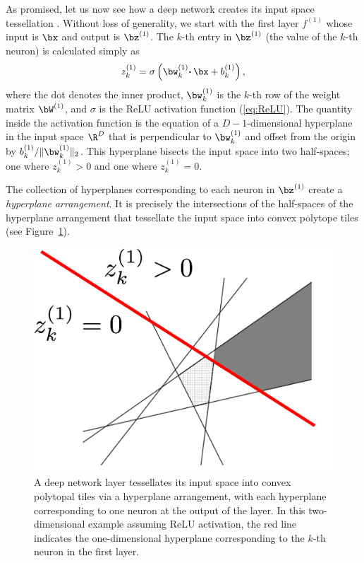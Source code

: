 \documentclass{notices}
\begin{document}
As promised, let us now see how a deep network creates its input space tessellation \cite{balestriero2021madmax}.
Without loss of generality, we start with the first layer $f^{(1)}$ whose input is $\bx$ and output is $\bz^{(1)}$.
The $k$-th entry in $\bz^{(1)}$ (the value of the $k$-th neuron) is calculated simply as 
\begin{equation}
z^{(1)}_k= \sigma \left( 
\bw^{(1)}_k {\boldsymbol{\cdot}}\, \bx + b_k^{(1)} 
  \right),
  \label{eq:neuron}
\end{equation}
where the dot denotes the inner product, $\bw^{(1)}_k$ is the $k$-th row of the weight matrix $\bW^{(1)}$, and $\sigma$ is the ReLU activation function (\ref{eq:ReLU}).
The quantity inside the activation function is the equation of a $D-1$-dimensional hyperplane in the input space $\R^D$ that is perpendicular to $\bw^{(1)}_k$ and offset from the origin by $b_k^{(1)}/\| \bw^{(1)}_k \|_2$.
This hyperplane bisects the input space into two half-spaces; one where $z^{(1)}_k>0$ and one where $z^{(1)}_k=0$.

The collection of hyperplanes corresponding to each neuron in $\bz^{(1)}$ create a {\em hyperplane arrangement}.
It is precisely the intersections of the half-spaces of the hyperplane arrangement that tessellate the input space into convex polytope tiles (see Figure~\ref{fig:ha}).



\begin{figure}[h]
    \centering
\includegraphics[width=0.8\linewidth]{Figs/ha1.png}
    \caption{\small
    A deep network layer tessellates its input space into convex polytopal tiles via a hyperplane arrangement, with each hyperplane corresponding to one neuron at the output of the layer.
    In this two-dimensional example assuming ReLU activation, the red line indicates the one-dimensional hyperplane corresponding to the $k$-th neuron in the first layer.}
    \label{fig:ha}
\end{figure}
\end{document}
